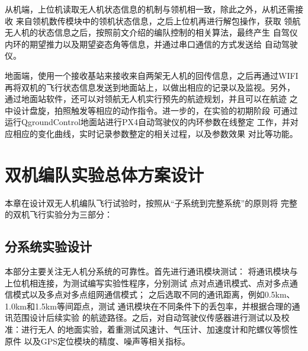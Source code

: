 从机端，上位机读取无人机状态信息的机制与领机相一致，除此之外，从机还需接收
来自领机数传模块中的领机状态信息，之后上位机再进行解包操作，获取
领航无人机的状态信息之后，按照前文介绍的编队控制的相关算法，最终产生
自驾仪内环的期望推力以及期望姿态角等信息，并通过串口通信的方式发送给
自动驾驶仪。

地面端，使用一个接收基站来接收来自两架无人机的回传信息，之后再通过WIFI
再将双机的飞行状态信息发送到地面站上，以做出相应的记录以及监视。另外，
通过地面站软件，还可以对领航无人机实行预先的航迹规划，并且可以在航迹
之中设计盘旋，拍照触发等相应的动作指令。进一步的，在实验的初期阶段
可通过运行QgroundControl地面站进行PX4自动驾驶仪的内环参数在线整定
工作，并对应相应的变化曲线，实时记录参数整定的相关过程，以及参数效果
对比等功能。
\section{双机编队实验总体方案设计}
本章在设计双无人机编队飞行试验时，按照从“子系统到完整系统”的原则将
完整的双机飞行实验分为三部分：
\subsection{分系统实验设计}
本部分主要关注无人机分系统的可靠性。首先进行通讯模块测试：
将通讯模块与上位机相连接，为测试编写实验性程序，分别测试
点对点通讯模式、点对多点通信模式以及多点对多点组网通信模式；
之后选取不同的通讯距离，例如0.5km、1.0km和1.5km等间距点，测试
通讯模块在不同条件下的丢包率，并根据合理的通讯范围设计后续实验
的航迹路径。之后，对自动驾驶仪传感器进行测试以及校准：进行无人
的地面实验，着重测试风速计、气压计、加速度计和陀螺仪等惯性原件
以及GPS定位模块的精度、噪声等相关指标。
